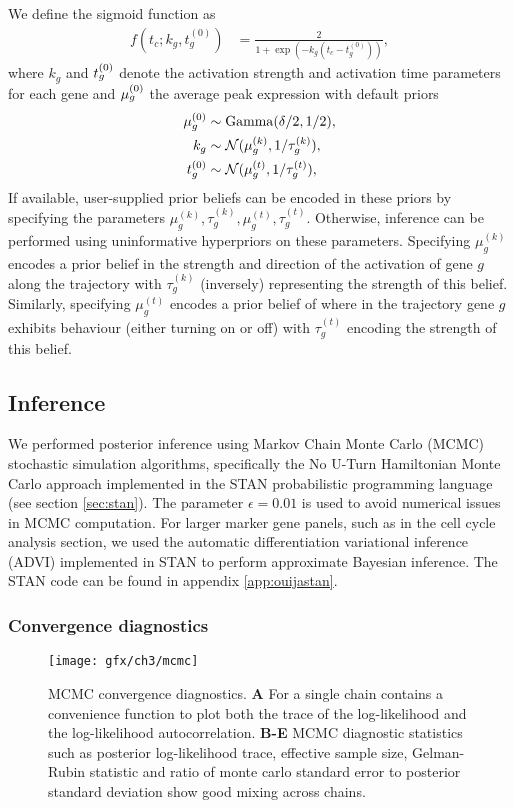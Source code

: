 We define the sigmoid function as
\begin{align}
	f(t_c;k_g,t^{(0)}_g) &= \frac{2}{1 + \exp\left(-k_g(t_c - t^{(0)}_g)\right)},
\end{align}
where $k_g$ and $t^{(0)}_g$ denote the activation strength and activation time parameters for each gene and $\mu^{(0)}_g$ the average peak expression
with default priors
\begin{align}
		\mu^{(0)}_g & \sim \mathrm{Gamma}(\delta / 2, 1 / 2), \\
		k_g & \sim \mathcal{N}(\mu^{(k)}_g, 1 / \tau^{(k)}_g), \\
		t^{(0)}_g & \sim \mathcal{N}(\mu^{(t)}_g, 1 / \tau^{(t)}_g),
\end{align}
If available, user-supplied prior beliefs can be encoded in these priors by specifying the parameters $\mu^{(k)}_g, \tau^{(k)}_g, \mu^{(t)}_g, \tau^{(t)}_g$. Otherwise, inference can be performed using uninformative hyperpriors on these parameters. Specifying $\mu^{(k)}_g$ encodes a prior belief in the strength and direction of the activation of gene $g$ along the trajectory with $\tau^{(k)}_g$ (inversely) representing the strength of this belief. Similarly, specifying $\mu^{(t)}_g$ encodes a prior belief of where in the trajectory gene $g$ exhibits behaviour (either turning on or off) with $\tau^{(t)}_g$ encoding the strength of this belief.

\subsection{Inference}

We performed posterior inference using Markov Chain Monte Carlo (MCMC) stochastic simulation algorithms, specifically the No U-Turn Hamiltonian Monte Carlo approach \cite{Hoffman2014-pl} implemented in the STAN probabilistic programming language \cite{carpenter2015stan} (see section \ref{sec:stan}). The parameter $\epsilon = 0.01$ is used to avoid numerical issues in MCMC computation. For larger marker gene panels, such as in the cell cycle analysis section, we used the automatic differentiation variational inference (ADVI) implemented in STAN to perform approximate Bayesian inference. The STAN code can be found in appendix \ref{app:ouijastan}.


\subsubsection{Convergence diagnostics}

\begin{figure}
\centering
 \texttt{[image: gfx/ch3/mcmc]}
 \caption[MCMC convergence diagnostics for Ouija.]{MCMC convergence diagnostics. \textbf{A} For a single chain \sname contains a convenience function to plot both the trace of the log-likelihood and the log-likelihood autocorrelation. \textbf{B-E} MCMC diagnostic statistics such as posterior log-likelihood trace, effective sample size, Gelman-Rubin statistic and ratio of monte carlo standard error to posterior standard deviation show good mixing across chains.} \label{fig:mcmc}
 \end{figure}


